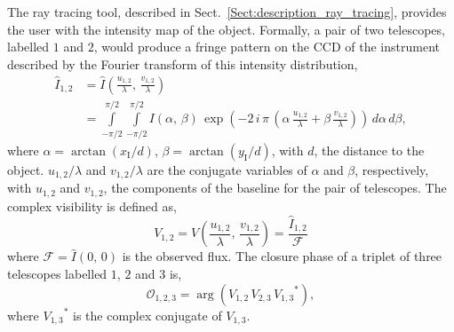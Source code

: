 \documentclass{report}
\newcommand{\ulam}{\frac{u_{1,2}}{\lambda}}
\newcommand{\vlam}{\frac{v_{1,2}}{\lambda}}
\newcommand{\xI}{x_\mathrm{I}}
\newcommand{\yI}{y_\mathrm{I}}
\newcommand{\Ocal}{\mathcal{O}}
\newcommand{\Fcal}{\mathcal{F}}
\begin{document}
The ray tracing tool, described in Sect.~\ref{Sect:description_ray_tracing}, provides the user with the intensity map of the object. Formally, a pair of two telescopes, labelled $1$ and $2$, would produce a fringe pattern on the CCD of the instrument described by the Fourier transform of this intensity distribution, 
\begin{equation}
    \begin{aligned}
        \hat{I}_{1,2} &= \hat{I}\left(\ulam, \, \vlam \right) \\
        &= \int\limits_{-\pi/2}^{\pi/2} \int\limits_{-\pi/2}^{\pi/2} I\left(\alpha, \, \beta\right) \, \exp{\left(-2 \, i \,  \pi \, \left( \alpha \, \ulam + \beta \, \vlam \right)\right)} \, d\alpha \, d\beta, \label{eq:FT}
    \end{aligned}
\end{equation}
where $\alpha = \arctan{(\xI / d)}$, $\beta = \arctan{(\yI / d)}$, with $d$,  the distance to the object. $u_{1,2} / \lambda$ and $v_{1,2} / \lambda$ are the conjugate variables of $\alpha$ and $\beta$, respectively, with $u_{1,2}$ and $v_{1,2}$, the components of the baseline for the pair of telescopes. The complex visibility is defined as,
\begin{equation}
    V_{1,2} = V\left(\ulam, \, \vlam \right) = \frac{\hat{I}_{1,2}}{\Fcal} \label{eq:vis}
\end{equation}
where $\Fcal = \hat{I}\left(0, \, 0\right)$ is the observed flux. The closure phase of a triplet of three telescopes labelled $1$, $2$ and $3$ is,
\begin{equation}
    \Ocal_{1,2,3} = \arg{\left(V_{1,2} \, V_{2,3} \, {V_{1,3}}^*\right)}, \label{eq:t3phi}
\end{equation}
where ${V_{1,3}}^*$ is the complex conjugate of $V_{1,3}$.
\end{document}
